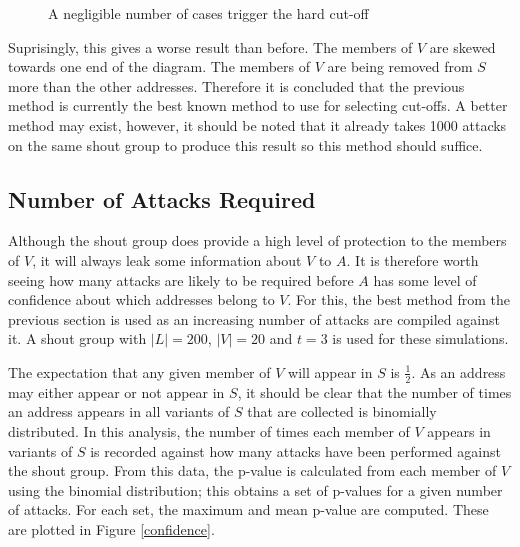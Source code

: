 \documentclass[ %
                    author={Luke Murray},
                supervisor={Dr. Simon Hollis},
                     title={Shadow Peer-to-Peer Networks},
                  subtitle={},
                    degree={MEng},
                      year={2013} ]{thesis}
\begin{document}
\begin{figure}[h]
\begin{minipage}[b]{0.4\linewidth}
        \caption{A negligible number of cases trigger the hard cut-off}
        \label{threshold_attack_dynamic2}
    \end{minipage}
\end{figure}

Suprisingly, this gives a worse result than before. The members of $V$ are skewed towards one end of the diagram. The members of $V$ are being removed from $S$ more than the other addresses. Therefore it is concluded that the previous method is currently the best known method to use for selecting cut-offs. A better method may exist, however, it should be noted that it already takes 1000 attacks on the same shout group to produce this result so this method should suffice.

\subsection{Number of Attacks Required}

Although the shout group does provide a high level of protection to the members of $V$, it will always leak some information about $V$ to $A$. It is therefore worth seeing how many attacks are likely to be required before $A$ has some level of confidence about which addresses belong to $V$. For this, the best method from the previous section is used as an increasing number of attacks are compiled against it. A shout group with $|L| = 200$, $|V| = 20$ and $t = 3$ is used for these simulations.

The expectation that any given member of $V$ will appear in $S$ is $\frac{1}{2}$. As an address may either appear or not appear in $S$, it should be clear that the number of times an address appears in all variants of $S$ that are collected is binomially distributed. In this analysis, the number of times each member of $V$ appears in variants of $S$ is recorded against how many attacks have been performed against the shout group. From this data, the p-value is calculated from each member of $V$ using the binomial distribution; this obtains a set of p-values for a given number of attacks. For each set, the maximum and mean p-value are computed. These are plotted in Figure \ref{confidence}.
\end{document}
